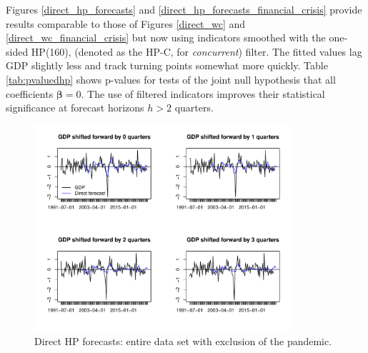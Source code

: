 \documentclass[11pt,a4paper]{article}
\begin{document}
Figures \eqref{direct_hp_forecasts} and \eqref{direct_hp_forecasts_financial_crisis} provide results comparable to those of Figures \eqref{direct_wc} and \eqref{direct_wc_financial_crisis} but now using indicators smoothed with the one-sided HP(160), (denoted as the HP-C, for \textit{concurrent}) filter.  The fitted values lag GDP slightly less and track turning points somewhat more quickly. Table \eqref{tab:pvaluedhp} shows p-values for tests of the joint null hypothesis that all coefficients ${\boldsymbol{\beta}} = 0$. The use of filtered indicators improves their statistical significance at forecast horizons $h > 2$ quarters. 

\begin{figure}[H]
    \begin{center}
        \includegraphics[width=0.85\textwidth]{./Figures/direct_hp_forecasts.pdf}
        \caption{Direct HP forecasts: entire data set with exclusion of the pandemic.
        \label{direct_hp_forecasts}}
    \end{center}
\end{figure}
\end{document}
